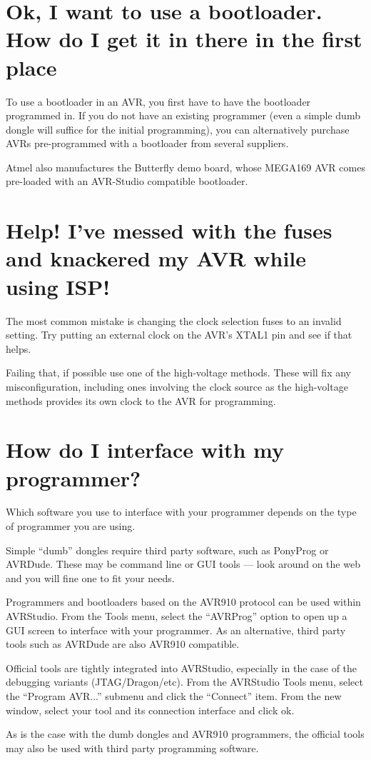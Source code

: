 \documentclass[a4paper,oneside]{book}
\begin{document}
\section{Ok, I want to use a bootloader. How do I get it in there in the first place\textinterrobang}
To use a bootloader in an AVR, you first have to have the bootloader programmed in. If you do not have an existing programmer (even a simple dumb dongle will suffice for the initial programming), you can alternatively purchase AVRs pre-programmed with a bootloader from several suppliers.

Atmel also manufactures the Butterfly demo board, whose MEGA169 AVR comes pre-loaded with an AVR-Studio compatible bootloader.

\section{Help! I've messed with the fuses and knackered my AVR while using ISP!}
The most common mistake is changing the clock selection fuses to an invalid setting. Try putting an external clock on the AVR's XTAL1 pin and see if that helps.

Failing that, if possible use one of the high-voltage methods. These will fix any misconfiguration, including ones involving the clock source as the high-voltage methods provides its own clock to the AVR for programming.

\section{How do I interface with my programmer?}
Which software you use to interface with your programmer depends on the type of programmer you are using.

Simple ``dumb'' dongles require third party software, such as PonyProg or AVRDude. These may be command line or GUI tools --- look around on the web and you will fine one to fit your needs.

Programmers and bootloaders based on the AVR910 protocol can be used within AVRStudio. From the Tools menu, select the ``AVRProg'' option to open up a GUI screen to interface with your programmer. As an alternative, third party tools such as AVRDude are also AVR910 compatible.

Official tools are tightly integrated into AVRStudio, especially in the case of the debugging variants (JTAG/Dragon/etc). From the AVRStudio Tools menu, select the ``Program AVR...'' submenu and click the ``Connect'' item. From the new window, select your tool and its connection interface and click ok.

As is the case with the dumb dongles and AVR910 programmers, the official tools may also be used with third party programming software.
\end{document}
